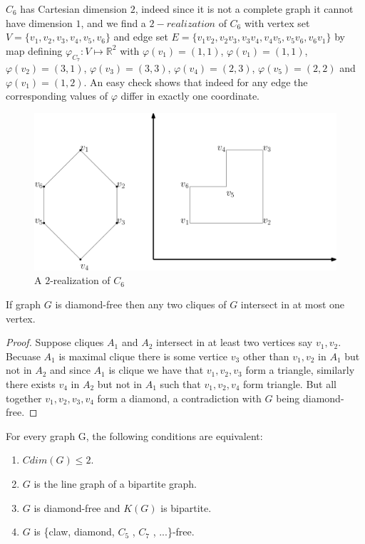 \documentclass[12pt,a4paper,titlepage,openany]{report}
\begin{document}
\begin{example}
$C_6$ has Cartesian dimension $2$, indeed since it is not a complete graph it cannot have dimension $1$, and we find a $2-realization$ of $C_6$ with vertex set $V=\{v_1,v_2,v_3,v_4,v_5,v_6\}$ and edge set $E=\{v_1v_2,v_2v_3,v_3v_4,v_4v_5,v_5v_6,v_6v_1\}$ by map defining $\varphi_{C_7}:V\mapsto \mathbb{R}^2$ with $\varphi(v_1)=(1,1)$, $\varphi(v_1)=(1,1)$, $\varphi(v_2)=(3,1)$, $\varphi(v_3)=(3,3)$, $\varphi(v_4)=(2,3)$, $\varphi(v_5)=(2,2)$ and $\varphi(v_1)=(1,2)$. An easy check shows that indeed for any edge the corresponding values of $\varphi$ differ in exactly one coordinate.
\begin{figure}[h]
\begin{center}
\includegraphics[width=1\linewidth]{figures/c_62real.png}
\end{center}
\caption{A $2$-realization of $C_6$}
\end{figure}
\end{example} 

\begin{lemma}\label{diamondfreecliques}
If graph $G$ is diamond-free then any two cliques of $G$ intersect in at most one vertex.
\end{lemma}
\begin{proof}
Suppose cliques $A_1$ and $A_2$ intersect in at least two vertices say $v_1, v_2$. Becuase $A_1$ is maximal clique there is some vertice $v_3$ other than $v_1,v_2$ in $A_1$ but not in $A_2$ and since $A_1$ is clique we have that $v_1,v_2,v_3$ form a triangle, similarly there exists $v_4$ in $A_2$ but not in $A_1$ such that $v_1,v_2,v_4$ form triangle. But all together $v_1,v_2,v_3,v_4$ form a diamond, a contradiction with $G$ being diamond-free.
\end{proof}

\begin{theorem}
For every graph G, the following conditions are equivalent:
\begin{enumerate}
\item $Cdim(G)\leq 2$.
\item $G$ is the line graph of a bipartite graph.
\item $G$ is diamond-free and $K(G)$ is bipartite.
\item $G$ is \{claw, diamond, $C_5$ , $C_7$ , ...\}-free.
\end{enumerate}
\end{theorem}
\end{document}
